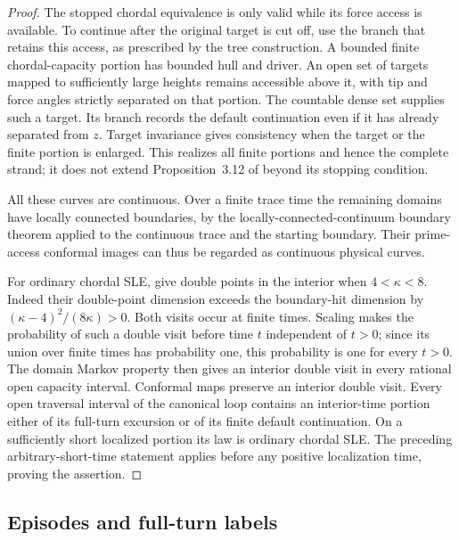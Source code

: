 \begin{proof}
The stopped chordal equivalence is only valid while its force access
is available.  To continue after the original target is cut off, use
the branch that retains this access, as prescribed by the tree
construction.  A bounded finite chordal-capacity portion has bounded
hull and driver.  An open set of targets mapped to sufficiently large
heights remains accessible above it, with tip and force angles strictly
separated on that portion.  The countable dense set supplies such a
target.  Its branch records the default continuation even if it has
already separated from $z$.  Target invariance gives consistency when
the target or the finite portion is enlarged.  This realizes all
finite portions and hence the complete strand; it does not extend
Proposition~3.12 of \citet{Sheffield2009Exploration} beyond its stopping
condition.

All these curves are continuous.  Over a finite trace time the
remaining domains have locally connected boundaries, by the
locally-connected-continuum boundary theorem applied to the continuous
trace and the starting boundary.  Their prime-access conformal images
can thus be regarded as continuous physical curves.

For ordinary chordal SLE, \citet[Theorem~1.1 and Corollary~1.7]{MillerWu2017}
give double points in the interior when $4<\kappa<8$.  Indeed their
double-point dimension exceeds the boundary-hit dimension by
$(\kappa-4)^2/(8\kappa)>0$.  Both visits occur at finite times.
Scaling makes the probability of such a double visit before time $t$
independent of $t>0$; since its union over finite times has probability
one, this probability is one for every $t>0$.  The domain Markov
property then gives an interior double visit in every rational open
capacity interval.  Conformal maps preserve an interior double visit.
Every open traversal interval of the canonical loop contains an
interior-time portion either of its full-turn excursion or of its
finite default continuation.  On a sufficiently short localized
portion its law is ordinary chordal SLE.  The preceding arbitrary-short-time
statement applies before any positive localization time,
proving the assertion.
\end{proof}

\subsection{Episodes and full-turn labels}
\label{loop:episodes}

